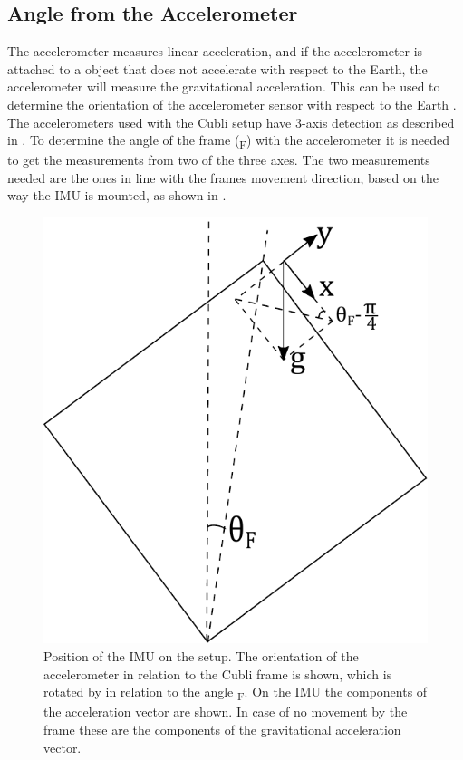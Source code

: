 \subsection{Angle from the Accelerometer}
The accelerometer measures linear acceleration, and if the accelerometer is attached to a object that does not accelerate with respect to the Earth, the accelerometer will measure the gravitational acceleration. This can be used to determine the orientation of the accelerometer sensor with respect to the Earth \cite{JWarren}.\\
The accelerometers used with the Cubli setup have 3-axis detection as described in . To determine the angle of the frame (\si{\theta_F}) with the accelerometer it is needed to get the measurements from two of the three axes. The two measurements needed are the ones in line with the frames movement direction, based on the way the IMU is mounted, as shown in . 
\begin{figure}[H]
	\centering
	\includegraphics[scale=0.6]{figures/accelerometer}
	\caption{Position of the IMU on the setup. The orientation of the accelerometer in relation to the Cubli frame is shown, which is rotated by \si{} in relation to the angle \si{\theta_F}. On the IMU the components of the acceleration vector are shown. In case of no movement by the frame these are the components of the gravitational acceleration vector.}
	\label{accelerometer}
\end{figure}\vspace{-5mm}
